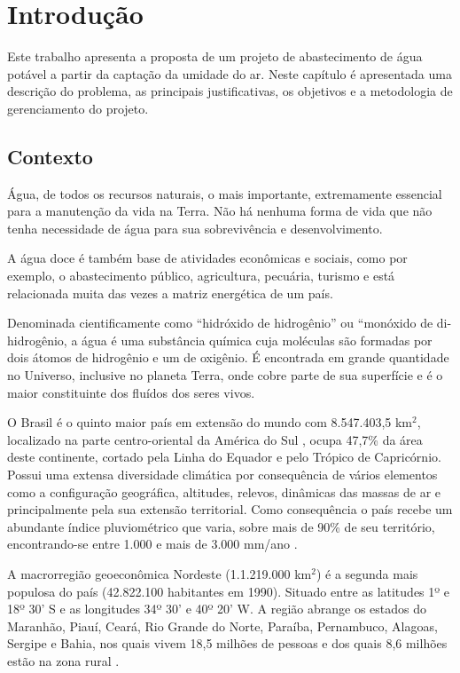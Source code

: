 \chapter[Introdução]{Introdução}

Este trabalho apresenta a proposta de um projeto de abastecimento de água potável a partir da captação da umidade do ar.
Neste capítulo é apresentada uma descrição do problema, as principais justificativas,
os objetivos e a metodologia de gerenciamento do projeto. 

\section{Contexto}

Água, de todos os recursos naturais, o mais importante, extremamente essencial para a manutenção da vida na Terra.
Não há nenhuma forma de vida que não tenha necessidade de água para sua sobrevivência e desenvolvimento. 

A água doce é também base de atividades econômicas e sociais, como por exemplo, o abastecimento público, agricultura,
pecuária, turismo e está relacionada muita das vezes a matriz energética de um país. 

Denominada cientificamente como “hidróxido de hidrogênio” ou “monóxido de di-hidrogênio, a água é uma substância química
cuja moléculas são formadas por dois átomos de hidrogênio e um de oxigênio. É encontrada em grande quantidade no Universo,
inclusive no planeta Terra, onde cobre parte de sua superfície e é o maior constituinte dos fluídos dos seres vivos. 

O Brasil é o quinto maior país em extensão do mundo com 8.547.403,5 km$^2$,
localizado na parte centro-oriental da América do Sul , ocupa 47,7\%  da área deste continente, cortado pela Linha do Equador
e pelo Trópico de Capricórnio. Possui uma extensa diversidade climática por consequência de vários elementos como a configuração
geográfica, altitudes, relevos, dinâmicas das massas de ar e principalmente pela sua extensão territorial. 
Como consequência o país recebe um abundante índice pluviométrico que varia, sobre mais de 90\% de seu território,
encontrando-se entre 1.000 e mais de 3.000 mm/ano \cite{reboucas03}.

A macrorregião geoeconômica Nordeste (1.1.219.000 km$^2$) é a segunda mais populosa do país (42.822.100 habitantes em 1990). 
Situado entre 	as latitudes 1º e 18º 30’ S e as longitudes 34º 30’ e 40º 20’ W.
A região abrange os estados do Maranhão, Piauí, Ceará, Rio Grande do Norte, Paraíba, Pernambuco, Alagoas, Sergipe e Bahia, nos
quais vivem 18,5 milhões de pessoas e dos quais 8,6 milhões estão na zona rural \cite{cirilo}.

